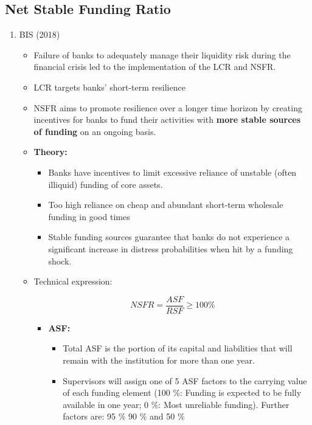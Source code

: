 \documentclass[a4paper,12pt]{article}
\begin{document}
\subsection{Net Stable Funding Ratio}

\begin{enumerate}
	\item BIS (2018)
		\begin{itemize}
			\item Failure of banks to adequately manage their liquidity risk during the financial crisis led to the implementation of the LCR and NSFR.

			\item LCR targets banks' short-term resilience

			\item NSFR aims to promote resilience over a longer time horizon by creating incentives for banks to fund their activities with \textbf{more stable sources of funding} on an ongoing basis.

			\item \textbf{Theory:}
			\begin{itemize}
				\item Banks have incentives to limit excessive reliance of unstable (often illiquid) funding of core assets. 

				\item Too high reliance on cheap and abundant short-term wholesale funding in good times

				\item Stable funding sources guarantee that banks do not experience a significant increase in distress probabilities when hit by a funding shock.
			\end{itemize}

			\item Technical expression:

			\begin{equation}
				NSFR = \frac{ASF}{RSF} \geq 100 \%
			\end{equation}

			\begin{itemize}
				\item \textbf{ASF:}

					\begin{itemize}
						\item Total ASF is the portion of its capital and liabilities that will remain with the institution for more than one year. 

						\item Supervisors will assign one of 5 ASF factors to the carrying value of each funding element (100 \%: Funding is expected to be fully available in one year; 0 \%: Most unreliable funding). Further factors are: 95 \%  90 \% and 50 \%


\end{itemize}
\end{itemize}
\end{itemize}
\end{enumerate}
\end{document}
